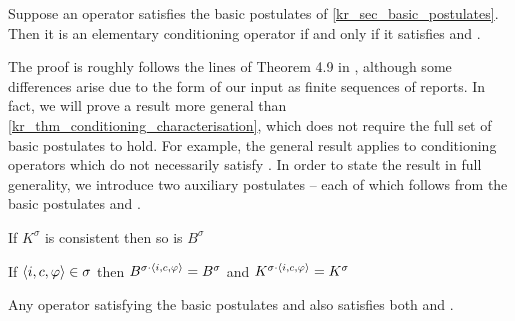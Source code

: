 \begin{theorem}
    \label{kr_thm_conditioning_characterisation}
    Suppose an operator satisfies the basic postulates of
    \cref{kr_sec_basic_postulates}. Then it is an elementary
    conditioning operator if and only if it satisfies \incvac{} and \acyc{}.
\end{theorem}

The proof is roughly follows the lines of Theorem 4.9 in
\cite{delgrande2018general}, although some differences arise due to the form of
our input as finite sequences of reports. In fact, we will prove a result more
general than \cref{kr_thm_conditioning_characterisation}, which does not
require the full set of basic postulates to hold. For example, the general
result applies to conditioning operators which do not necessarily satisfy
\soundness{}. In order to state the result in full generality, we introduce two
auxiliary postulates -- each of which follows from the basic postulates and
\incvac{}.

\begin{axiomlist}
\begin{axiom}[\condcons{}]
    If $K^\sigma$ is consistent then so is $B^\sigma$
\end{axiom}
\begin{axiom}[\duprem{}]
    If $\langle {i, c, \varphi} \rangle \in \sigma$ then $B^{\sigma \cdot \langle {i, c,
    \varphi} \rangle} = B^\sigma$ and $K^{\sigma \cdot \langle {i, c, \varphi} \rangle} = K^\sigma$
\end{axiom}
\end{axiomlist}

\begin{lemma}
    \label{kr_lemma_condcons_duprem_follow}
    Any operator satisfying the basic postulates and \incvac{} also satisfies
    both \condcons{} and \duprem{}.
\end{lemma}

